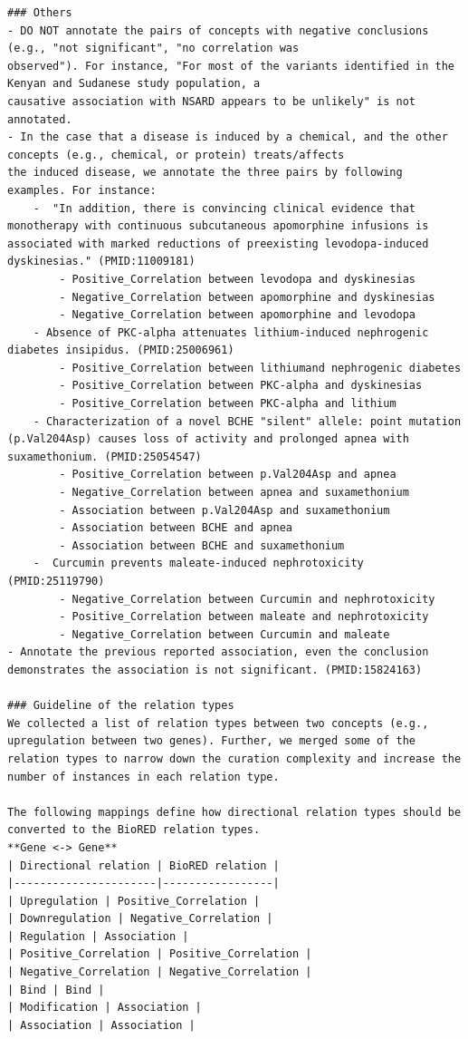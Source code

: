 \begin{lstlisting}
### Others
- DO NOT annotate the pairs of concepts with negative conclusions (e.g., "not significant", "no correlation was
observed"). For instance, "For most of the variants identified in the Kenyan and Sudanese study population, a
causative association with NSARD appears to be unlikely" is not annotated.
- In the case that a disease is induced by a chemical, and the other concepts (e.g., chemical, or protein) treats/affects
the induced disease, we annotate the three pairs by following examples. For instance:
    -  "In addition, there is convincing clinical evidence that monotherapy with continuous subcutaneous apomorphine infusions is associated with marked reductions of preexisting levodopa-induced dyskinesias." (PMID:11009181)
        - Positive_Correlation between levodopa and dyskinesias
        - Negative_Correlation between apomorphine and dyskinesias
        - Negative_Correlation between apomorphine and levodopa
    - Absence of PKC-alpha attenuates lithium-induced nephrogenic diabetes insipidus. (PMID:25006961)
        - Positive_Correlation between lithiumand nephrogenic diabetes
        - Positive_Correlation between PKC-alpha and dyskinesias
        - Positive_Correlation between PKC-alpha and lithium
    - Characterization of a novel BCHE "silent" allele: point mutation (p.Val204Asp) causes loss of activity and prolonged apnea with suxamethonium. (PMID:25054547)
        - Positive_Correlation between p.Val204Asp and apnea
        - Negative_Correlation between apnea and suxamethonium
        - Association between p.Val204Asp and suxamethonium
        - Association between BCHE and apnea
        - Association between BCHE and suxamethonium
    -  Curcumin prevents maleate-induced nephrotoxicity (PMID:25119790)
        - Negative_Correlation between Curcumin and nephrotoxicity
        - Positive_Correlation between maleate and nephrotoxicity
        - Negative_Correlation between Curcumin and maleate
- Annotate the previous reported association, even the conclusion demonstrates the association is not significant. (PMID:15824163)

### Guideline of the relation types
We collected a list of relation types between two concepts (e.g., upregulation between two genes). Further, we merged some of the relation types to narrow down the curation complexity and increase the number of instances in each relation type.

The following mappings define how directional relation types should be converted to the BioRED relation types.
**Gene <-> Gene**
| Directional relation | BioRED relation |
|----------------------|-----------------|
| Upregulation | Positive_Correlation |
| Downregulation | Negative_Correlation |
| Regulation | Association |
| Positive_Correlation | Positive_Correlation |
| Negative_Correlation | Negative_Correlation |
| Bind | Bind |
| Modification | Association |
| Association | Association |


\end{lstlisting}
